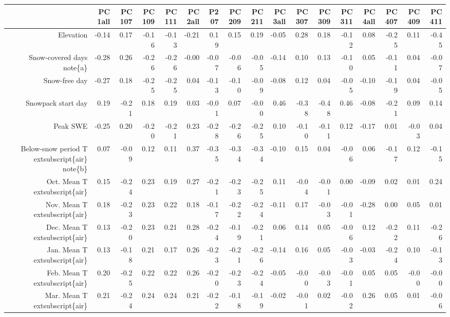 \begin{table}[ht]
\centering
\begin{tabular}{rrrrrrrrrrrrrrrrr}
  \hline
 & PC1all & PC107 & PC109 & PC111 & PC2all & P207 & PC209 & PC211 & PC3all & PC307 & PC309 & PC311 & PC4all & PC407 & PC409 & PC411 \\ 
  \hline
Elevation & -0.14 & 0.17 & -0.16 & -0.13 & -0.21 & 0.19 & 0.15 & 0.19 & -0.05 & 0.28 & 0.18 & -0.12 & 0.08 & -0.25 & 0.11 & -0.45 \\ 
  Snow-covered days	note\{a\} & -0.28 & 0.26 & -0.26 & -0.26 & -0.00 & -0.07 & -0.06 & -0.05 & -0.14 & 0.10 & 0.13 & -0.10 & 0.05 & -0.11 & 0.04 & -0.07 \\ 
  Snow-free day & -0.27 & 0.18 & -0.25 & -0.25 & 0.04 & -0.13 & -0.10 & -0.09 & -0.08 & 0.12 & 0.04 & -0.05 & -0.10 & -0.19 & 0.04 & -0.05 \\ 
  Snowpack start day & 0.19 & -0.21 & 0.18 & 0.19 & 0.03 & -0.01 & 0.07 & -0.00 & 0.46 & -0.38 & -0.48 & 0.46 & -0.08 & -0.21 & 0.09 & 0.14 \\ 
  Peak SWE & -0.25 & 0.20 & -0.20 & -0.21 & 0.23 & -0.28 & -0.26 & -0.25 & 0.10 & -0.10 & -0.11 & 0.12 & -0.17 & 0.01 & -0.03 & 0.04 \\ 
  Below-snow period T	extsubscript\{air\}	note\{b\} & 0.07 & -0.09 & 0.12 & 0.11 & 0.37 & -0.35 & -0.34 & -0.34 & -0.10 & 0.15 & 0.04 & -0.06 & 0.06 & -0.17 & 0.12 & -0.15 \\ 
  Oct. Mean T	extsubscript\{air\} & 0.15 & -0.24 & 0.23 & 0.19 & 0.27 & -0.21 & -0.23 & -0.25 & 0.11 & -0.04 & -0.01 & 0.00 & -0.09 & 0.02 & 0.01 & 0.24 \\ 
  Nov. Mean T	extsubscript\{air\} & 0.18 & -0.23 & 0.23 & 0.22 & 0.18 & -0.17 & -0.22 & -0.24 & -0.11 & 0.17 & -0.03 & -0.01 & -0.28 & 0.00 & 0.05 & 0.01 \\ 
  Dec. Mean T	extsubscript\{air\} & 0.13 & -0.20 & 0.23 & 0.21 & 0.28 & -0.24 & -0.19 & -0.21 & 0.06 & 0.14 & 0.05 & -0.06 & 0.12 & -0.22 & 0.11 & -0.26 \\ 
  Jan. Mean T	extsubscript\{air\} & 0.13 & -0.18 & 0.21 & 0.17 & 0.26 & -0.23 & -0.21 & -0.26 & -0.14 & 0.16 & 0.05 & -0.03 & -0.03 & -0.24 & 0.10 & -0.13 \\ 
  Feb. Mean T	extsubscript\{air\} & 0.20 & -0.25 & 0.22 & 0.22 & 0.26 & -0.20 & -0.23 & -0.24 & -0.05 & -0.00 & -0.03 & -0.01 & 0.05 & 0.05 & -0.00 & -0.00 \\ 
  Mar. Mean T	extsubscript\{air\} & 0.21 & -0.24 & 0.24 & 0.24 & 0.21 & -0.22 & -0.18 & -0.19 & -0.02 & -0.01 & 0.02 & -0.02 & 0.26 & 0.05 & 0.01 & -0.06 \\ 

\end{tabular}
\end{table}
